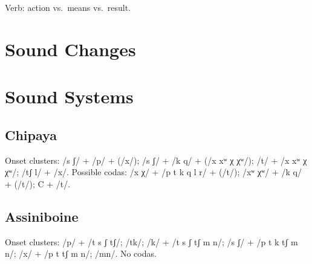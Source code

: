 \documentclass[11pt]{article}
\begin{document}
Verb: action vs.\ means vs.\ result.

\section{Sound Changes}
{\small

}

\section{Sound Systems}

\subsection{Chipaya} Onset clusters: /s ʃ/ + /p/ + (/x/); /s ʃ/ + /k q/ +
(/x xʷ χ χʷ/); /t/ + /x xʷ χ χʷ/; /tʃ l/ + /x/.  Possible codas: /x χ/
+ /p t k q l r/ + (/t/); /xʷ χʷ/ + /k q/ + (/t/); C + /t/. 

\subsection{Assiniboine} Onset clusters: /p/ + /t s ʃ tʃ/; /tk/; /k/ +
/t s ʃ tʃ m n/; /s ʃ/ + /p t k tʃ m n/; /x/ + /p t tʃ m n/; /mn/.  No
codas. 
\end{document}
